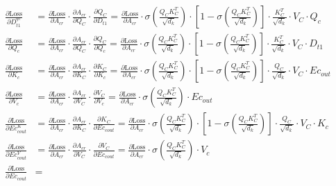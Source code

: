 \documentclass[12pt,letterpaper]{article}
\begin{document}
\begin{align*}
\\
\frac{\partial \text{Loss}}{\partial D^{qc}_{t1}} &= %
\frac{\partial \text{Loss}}{\partial A_{cr}} \cdot 
\frac{\partial A_{cr}}{\partial Q_{C}}\cdot
\frac{\partial Q_{C}}{\partial D_{t1}}=
\frac{\partial \text{Loss}}{\partial A_{cr}}\cdot
\sigma\left(\frac{Q_{C} K_{C}^T}{\sqrt{d_k}}\right)\cdot \left[1-\sigma\left(\frac{Q_{C} K_{C}^T}{\sqrt{d_k}}\right)\right]\cdot
\frac{K_{C}^T}{\sqrt{d_k}}\cdot V_C \cdot Q_{c}
\\
\frac{\partial \text{Loss}}{\partial Q_{c}} &= %
\frac{\partial \text{Loss}}{\partial A_{cr}} \cdot 
\frac{\partial A_{cr}}{\partial Q_{C}}\cdot
\frac{\partial Q_{C}}{\partial Q_{c}}=
\frac{\partial \text{Loss}}{\partial A_{cr}}\cdot
\sigma\left(\frac{Q_{C} K_{C}^T}{\sqrt{d_k}}\right)\cdot \left[1-\sigma\left(\frac{Q_{C} K_{C}^T}{\sqrt{d_k}}\right)\right]\cdot
\frac{K_{C}^T}{\sqrt{d_k}}\cdot V_C \cdot D_{t1}
\\
\frac{\partial \text{Loss}}{\partial K_{c}} &= %
\frac{\partial \text{Loss}}{\partial A_{cr}} \cdot 
\frac{\partial A_{cr}}{\partial K_{C}}\cdot
\frac{\partial K_{C}}{\partial K_{c}}=
\frac{\partial \text{Loss}}{\partial A_{cr}}\cdot
\sigma\left(\frac{Q_{C} K_{C}^T}{\sqrt{d_k}}\right)\cdot \left[1-\sigma\left(\frac{Q_{C} K_{C}^T}{\sqrt{d_k}}\right)\right]\cdot
\frac{Q_{C}}{\sqrt{d_k}}\cdot V_C \cdot Ec_{out}
\\
\frac{\partial \text{Loss}}{\partial V_{c}} &= %
\frac{\partial \text{Loss}}{\partial A_{cr}} \cdot 
\frac{\partial A_{cr}}{\partial V_{C}}\cdot
\frac{\partial V_{C}}{\partial V_{c}}=
\frac{\partial \text{Loss}}{\partial A_{cr}}\cdot
\sigma\left(\frac{Q_{C} K_{C}^T}{\sqrt{d_k}}\right)
\cdot Ec_{out}
\\
\frac{\partial \text{Loss}}{\partial Ec^K_{cout}} &= %
\frac{\partial \text{Loss}}{\partial A_{cr}} \cdot 
\frac{\partial A_{cr}}{\partial K_{C}}\cdot
\frac{\partial K_{C}}{\partial Ec_{cout}}=
\frac{\partial \text{Loss}}{\partial A_{cr}}\cdot
\sigma\left(\frac{Q_{C} K_{C}^T}{\sqrt{d_k}}\right)\cdot \left[1-\sigma\left(\frac{Q_{C} K_{C}^T}{\sqrt{d_k}}\right)\right]\cdot
\frac{Q_{C}}{\sqrt{d_k}}\cdot V_C \cdot K_c
\\
\frac{\partial \text{Loss}}{\partial Ec^V_{cout}} &= %
\frac{\partial \text{Loss}}{\partial A_{cr}} \cdot 
\frac{\partial A_{cr}}{\partial V_{C}}\cdot
\frac{\partial V_{C}}{\partial Ec_{cout}}=
\frac{\partial \text{Loss}}{\partial A_{cr}}\cdot
\sigma\left(\frac{Q_{C} K_{C}^T}{\sqrt{d_k}}\right)
\cdot V_c
\\
\frac{\partial \text{Loss}}{\partial Ec_{cout}} &= %

\end{align*}
\end{document}
